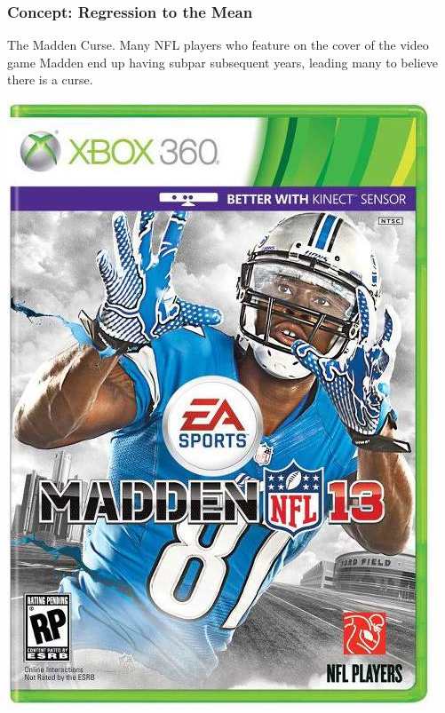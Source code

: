 \documentclass[handout]{beamer}
\begin{document}
\begin{frame}[fragile]
\frametitle{Concept: Regression to the Mean}

The Madden Curse.  Many NFL players who feature on the cover of the video game Madden end up having subpar subsequent years, leading many to believe there is a curse.

\begin{center}
\includegraphics[height=0.7\textheight]{figure/MaddenCurse.jpg}
\end{center}


\end{frame}
\end{document}
